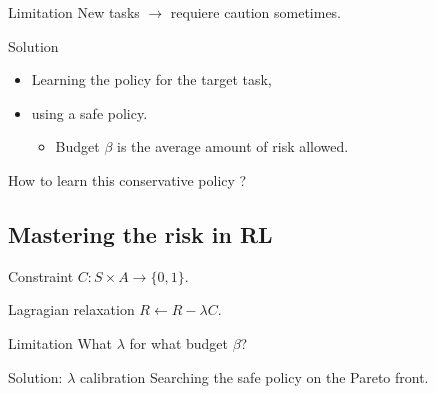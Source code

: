 \documentclass{beamer}
\begin{document}
    \begin{frame}

        \begin{alertblock}{Limitation}
            New tasks $\rightarrow$ requiere caution sometimes.
        \end{alertblock}


        \begin{exampleblock}{Solution}
            \begin{itemize}
                \item Learning the policy for the target task,
                \item using a safe policy.
                \begin{itemize}
                    \item Budget $\beta$ is the average amount of risk allowed.
                \end{itemize}
            \end{itemize}
        \end{exampleblock}

        \begin{block}{}
            How to learn this conservative policy ?
        \end{block}

    \end{frame}

    \subsection{Mastering the risk in RL}

    \begin{frame}

        \begin{block}{Constraint}
            $C:S\times A \rightarrow \{0,1\}$.
        \end{block}

        \begin{block}{Lagragian relaxation}
            $R \leftarrow R - \lambda C$.
        \end{block}


        \begin{alertblock}{Limitation}
            What $\lambda$ for what budget $\beta$?
        \end{alertblock}

        \begin{exampleblock}{Solution: $\lambda$ calibration}%
            Searching the safe policy on the Pareto front.
        \end{exampleblock}


    \end{frame}
\end{document}
